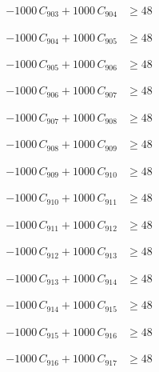 \documentclass[a4paper,11pt]{article}
\begin{document}
\begin{align}
-1000\,C_{903} + 1000\,C_{904} &\geq 48 \nonumber
\end{align}

\begin{align}
-1000\,C_{904} + 1000\,C_{905} &\geq 48 \nonumber
\end{align}

\begin{align}
-1000\,C_{905} + 1000\,C_{906} &\geq 48 \nonumber
\end{align}

\begin{align}
-1000\,C_{906} + 1000\,C_{907} &\geq 48 \nonumber
\end{align}

\begin{align}
-1000\,C_{907} + 1000\,C_{908} &\geq 48 \nonumber
\end{align}

\begin{align}
-1000\,C_{908} + 1000\,C_{909} &\geq 48 \nonumber
\end{align}

\begin{align}
-1000\,C_{909} + 1000\,C_{910} &\geq 48 \nonumber
\end{align}

\begin{align}
-1000\,C_{910} + 1000\,C_{911} &\geq 48 \nonumber
\end{align}

\begin{align}
-1000\,C_{911} + 1000\,C_{912} &\geq 48 \nonumber
\end{align}

\begin{align}
-1000\,C_{912} + 1000\,C_{913} &\geq 48 \nonumber
\end{align}

\begin{align}
-1000\,C_{913} + 1000\,C_{914} &\geq 48 \nonumber
\end{align}

\begin{align}
-1000\,C_{914} + 1000\,C_{915} &\geq 48 \nonumber
\end{align}

\begin{align}
-1000\,C_{915} + 1000\,C_{916} &\geq 48 \nonumber
\end{align}

\begin{align}
-1000\,C_{916} + 1000\,C_{917} &\geq 48 \nonumber
\end{align}
\end{document}
